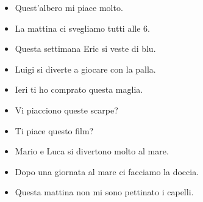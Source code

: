 \documentclass[letter,11pt]{article}
\begin{document}
\vskip 0.2in

\begin{multicols}{2}
\begin{itemize}
    \item Quest'albero mi piace molto.
    \item La mattina ci svegliamo tutti alle 6.
    \item Questa settimana Eric si veste di blu.
    \item Luigi si diverte a giocare con la palla.
    \item Ieri ti ho comprato questa maglia.
    \item Vi piacciono queste scarpe?
    \item Ti piace questo film?
    \item Mario e Luca si divertono molto al mare.
    \item Dopo una giornata al mare ci facciamo la doccia.
    \item Questa mattina non mi sono pettinato i capelli.


\end{itemize}
\end{multicols}
\end{document}
